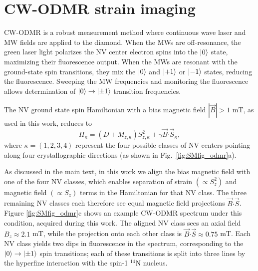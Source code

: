 \documentclass[reprint,superscriptaddress,hyphens,amsmath,amssymb,aps,prx,float]{revtex4-2}
\begin{document}
\section{CW-ODMR strain imaging}
\label{sec:CWODMR}

CW-ODMR is a robust measurement method where continuous wave laser and MW fields are applied to the diamond.  When the MWs are off-resonance, the green laser light polarizes the NV center electron spins into the $\ket{0}$ state, maximizing their fluorescence output.  When the MWs are resonant with the ground-state spin transitions, they mix the $\ket{0}$ and $\ket{+1}$ or $\ket{-1}$ states, reducing the fluorescence.  Sweeping the MW frequencies and monitoring the fluorescence allows determination of $\ket{0}\rightarrow\ket{\pm1}$ transition frequencies.

The NV ground state spin Hamiltonian with a bias magnetic field $|\vec{B}|>1$ mT, as used in this work, reduces to \cite{StrainPaper}
\begin{equation}
\label{eqn:vectorhamiltonian}
    H_\kappa = (D + M_{z,\kappa})S_{z,\kappa}^2+\gamma \vec{B}\boldsymbol{\cdot}\vec{S}_\kappa,
\end{equation}
where $\kappa=(1,2,3,4)$ represent the four possible classes of NV centers pointing along four crystallographic directions (as shown in Fig.~\ref{fig:SMfig_odmr}a).

As discussed in the main text, in this work we align the bias magnetic field with one of the four NV classes, which enables separation of strain $(\propto S_z^2)$ and magnetic field $(\propto S_z)$ terms in the Hamiltonian for that NV class.  The three remaining NV classes each therefore see equal magnetic field projections $\vec{B}\boldsymbol{\cdot}\vec{S}$.  Figure \ref{fig:SMfig_odmr}c shows an example CW-ODMR spectrum under this condition, acquired during this work.  The aligned NV class sees an axial field $B_z\approx2.1$ mT, while the projection onto each other class is $\vec{B}\boldsymbol{\cdot}\vec{S}\approx0.75$ mT.  Each NV class yields two dips in fluorescence in the spectrum, corresponding to the $\ket{0}\rightarrow\ket{\pm1}$ spin transitions; each of these transitions is split into three lines by the hyperfine interaction with the spin-1 $^{14}$N nucleus.  
\end{document}
